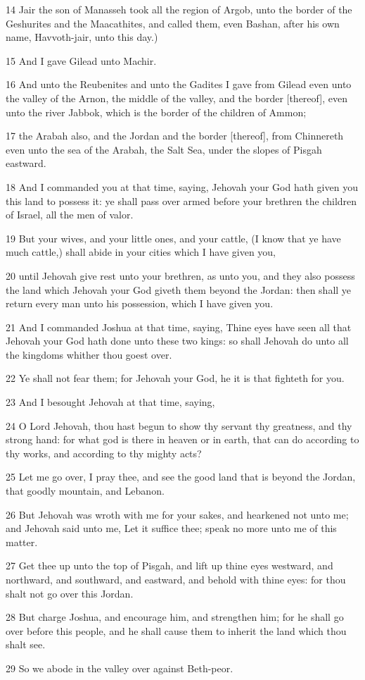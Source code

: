 \par 14 Jair the son of Manasseh took all the region of Argob, unto the border of the Geshurites and the Maacathites, and called them, even Bashan, after his own name, Havvoth-jair, unto this day.)
\par 15 And I gave Gilead unto Machir.
\par 16 And unto the Reubenites and unto the Gadites I gave from Gilead even unto the valley of the Arnon, the middle of the valley, and the border [thereof], even unto the river Jabbok, which is the border of the children of Ammon;
\par 17 the Arabah also, and the Jordan and the border [thereof], from Chinnereth even unto the sea of the Arabah, the Salt Sea, under the slopes of Pisgah eastward.
\par 18 And I commanded you at that time, saying, Jehovah your God hath given you this land to possess it: ye shall pass over armed before your brethren the children of Israel, all the men of valor.
\par 19 But your wives, and your little ones, and your cattle, (I know that ye have much cattle,) shall abide in your cities which I have given you,
\par 20 until Jehovah give rest unto your brethren, as unto you, and they also possess the land which Jehovah your God giveth them beyond the Jordan: then shall ye return every man unto his possession, which I have given you.
\par 21 And I commanded Joshua at that time, saying, Thine eyes have seen all that Jehovah your God hath done unto these two kings: so shall Jehovah do unto all the kingdoms whither thou goest over.
\par 22 Ye shall not fear them; for Jehovah your God, he it is that fighteth for you.
\par 23 And I besought Jehovah at that time, saying,
\par 24 O Lord Jehovah, thou hast begun to show thy servant thy greatness, and thy strong hand: for what god is there in heaven or in earth, that can do according to thy works, and according to thy mighty acts?
\par 25 Let me go over, I pray thee, and see the good land that is beyond the Jordan, that goodly mountain, and Lebanon.
\par 26 But Jehovah was wroth with me for your sakes, and hearkened not unto me; and Jehovah said unto me, Let it suffice thee; speak no more unto me of this matter.
\par 27 Get thee up unto the top of Pisgah, and lift up thine eyes westward, and northward, and southward, and eastward, and behold with thine eyes: for thou shalt not go over this Jordan.
\par 28 But charge Joshua, and encourage him, and strengthen him; for he shall go over before this people, and he shall cause them to inherit the land which thou shalt see.
\par 29 So we abode in the valley over against Beth-peor.

